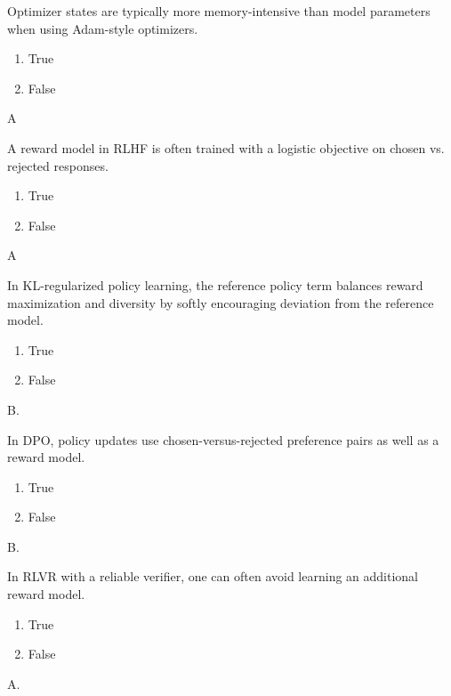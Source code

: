 \question[2]
Optimizer states are typically more memory-intensive than model parameters when using Adam-style optimizers.
\begin{enumerate}
\item True
\item False
\end{enumerate}
\begin{soln}
A
\end{soln}

\question[2]
A reward model in RLHF is often trained with a logistic objective on chosen vs. rejected responses.
\begin{enumerate}
\item True
\item False
\end{enumerate}
\begin{soln}
A
\end{soln}

\question[2]
  In KL-regularized policy learning, the reference policy term balances reward maximization and diversity by softly encouraging deviation from the reference model.
\begin{enumerate}
\item True
\item False
\end{enumerate}
\begin{soln}
B.
\end{soln}

\question[2]
In DPO, policy updates use chosen-versus-rejected preference pairs as well as a reward model.
\begin{enumerate}
\item True
\item False
\end{enumerate}
\begin{soln}
B.
\end{soln}

\question[2]
In RLVR with a reliable verifier,  one can often avoid learning an additional reward model.
\begin{enumerate}
\item True
\item False
\end{enumerate}
\begin{soln}
A.
\end{soln}



